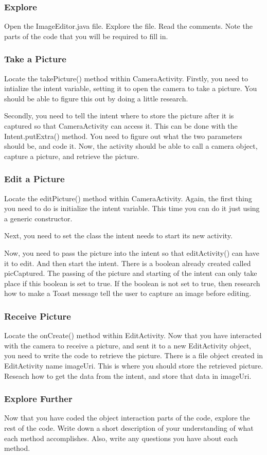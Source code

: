 \subsubsection{Explore}
Open the ImageEditor.java file. Explore the file. Read the comments. Note the parts of the code that you will be required to fill in.

\subsubsection{Take a Picture}
Locate the takePicture() method within CameraActivity. Firstly, you need to intialize the intent variable, setting it to open the camera to take a picture. You should be able to figure this out by doing a little research.

Secondly, you need to tell the intent where to store the picture after it is captured so that CameraActivity can access it. This can be done with the Intent.putExtra() method. You need to figure out what the two parameters should be, and code it. Now, the activity should be able to call a camera object, capture a picture, and retrieve the picture.

\subsubsection{Edit a Picture}
Locate the editPicture() method within CameraActivity. Again, the first thing you need to do is initialize the intent variable. This time you can do it just using a generic constructor.

Next, you need to set the class the intent needs to start its new activity. 

Now, you need to pass the picture into the intent so that editActivity() can have it to edit. And then start the intent. There is a boolean already created called picCaptured. The passing of the picture and starting of the intent can only take place if this boolean is set to true. If the boolean is not set to true, then research how to make a Toast message tell the user to capture an image before editing.

\subsubsection{Receive Picture}
Locate the onCreate() method within EditActivity. Now that you have interacted with the camera to receive a picture, and sent it to a new EditActivity object, you need to write the code to retrieve the picture. There is a file object created in EditActivity name imageUri. This is where you should store the retrieved picture. Reseach how to get the data from the intent, and store that data in imageUri.

\subsubsection{Explore Further}
Now that you have coded the object interaction parts of the code, explore the rest of the code. Write down a short description of your understanding of what each method accomplishes. Also, write any questions you have about each method.